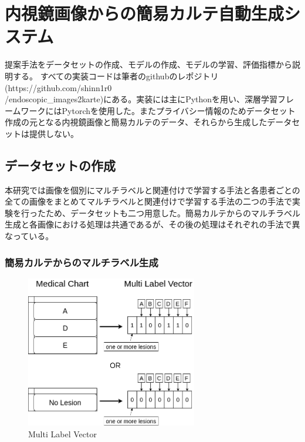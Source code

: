 \section{内視鏡画像からの簡易カルテ自動生成システム}
提案手法をデータセットの作成、モデルの作成、モデルの学習、評価指標から説明する。
すべての実装コードは筆者のgithubのレポジトリ (https://github.com/shinn1r0\\/endoscopic\_images2karte)にある。実装には主にPythonを用い、深層学習フレームワークにはPytorchを使用した。またプライバシー情報のためデータセット作成の元となる内視鏡画像と簡易カルテのデータ、それらから生成したデータセットは提供しない。
\subsection{データセットの作成}
本研究では画像を個別にマルチラベルと関連付けで学習する手法と各患者ごとの全ての画像をまとめてマルチラベルと関連付けで学習する手法の二つの手法で実験を行ったため、データセットも二つ用意した。簡易カルテからのマルチラベル生成と各画像における処理は共通であるが、その後の処理はそれぞれの手法で異なっている。
\subsubsection{簡易カルテからのマルチラベル生成}

\begin{figure}[tb]
    \begin{center}
        \includegraphics[width=75mm]{./fig/1.png}
        \caption{Multi Label Vector}
        \label{fig:multilabel}
    \end{center}
\end{figure}

